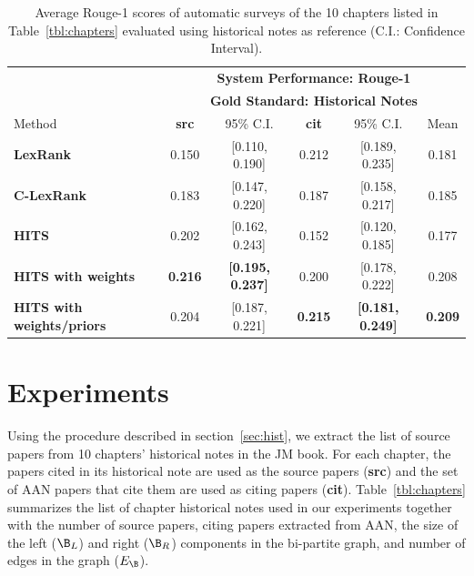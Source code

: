 
\begin{table}[ht!]
\centering
{\small
\begin{tabular}{l@{\hspace{2cm}}cc@{\hspace{1cm}}cc@{\hspace{1cm}}c} \hline
       & \multicolumn{5}{c}{{\bf System Performance: Rouge-1}}\\
       & \multicolumn{5}{c}{{\bf Gold Standard: Historical Notes}}\\ \hline
Method & {\bf  src} & 95\% C.I. & {\bf cit} & 95\% C.I. & Mean\\ \hline \hline
{\bf LexRank}                   & 0.150 & [0.110, 0.190]  & 0.212 & [0.189, 0.235]  & 0.181\\
{\bf C-LexRank}                 & 0.183 & [0.147, 0.220]  & 0.187 & [0.158, 0.217]  & 0.185\\
{\bf HITS}                      & 0.202 & [0.162, 0.243]  & 0.152 & [0.120, 0.185]  & 0.177\\
{\bf HITS with weights}         & {\bf 0.216} & {\bf [0.195, 0.237]}  & 0.200 & [0.178, 0.222]  & 0.208\\
{\bf HITS with weights/priors}  & 0.204 & [0.187, 0.221]  & {\bf 0.215} & {\bf [0.181, 0.249]}  & {\bf 0.209}\\ \hline 
\end{tabular}}
\caption{Average Rouge-1 scores of automatic surveys of the 10 chapters listed in Table~\ref{tbl:chapters} evaluated using historical notes as reference (C.I.: Confidence Interval).}\label{tbl:rouge1-hist}
\end{table}

\section{Experiments}
\label{sec:exp}

Using the procedure described in section~\ref{sec:hist}, we extract the list of source papers from 10 chapters' historical notes in the JM book. For each chapter, the papers cited in its historical note are used as the source papers ({\bf src}) and the set of AAN papers that cite them are used as citing papers ({\bf cit}). 
Table~\ref{tbl:chapters} summarizes the list of chapter historical notes used in our experiments together with the number of source papers,  citing papers extracted from AAN, the size of the left ($\B_L$) and right ($\B_R$) components in the bi-partite graph, and number of edges in the graph ($E_\B$).

